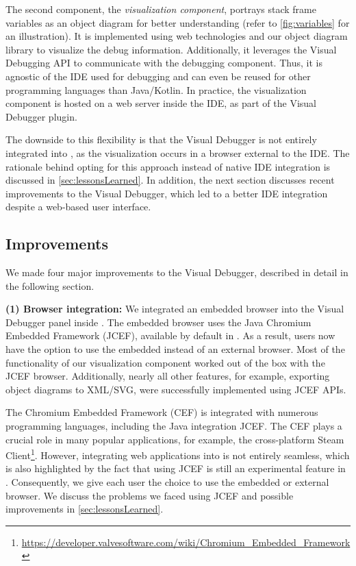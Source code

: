 \documentclass[sigconf]{acmart}
\begin{document}
The second component, the \textit{visualization component}, portrays stack frame variables as an object diagram for better understanding (refer to \autoref{fig:variables} for an illustration).
It is implemented using web technologies and our object diagram library \cite{timkrauterObjectdiagramjs2023} to visualize the debug information.
Additionally, it leverages the Visual Debugging API to communicate with the debugging component.
Thus, it is agnostic of the IDE used for debugging and can even be reused for other programming languages than Java/Kotlin.
In practice, the visualization component is hosted on a web server inside the IDE, as part of the Visual Debugger plugin.

The downside to this flexibility is that the Visual Debugger is not entirely integrated into \intellij{}, as the visualization occurs in a browser external to the IDE.
The rationale behind opting for this approach instead of native IDE integration is discussed in \autoref{sec:lessonsLearned}.
In addition, the next section discusses recent improvements to the Visual Debugger, which led to a better IDE integration despite a web-based user interface.

\subsection{Improvements} \label{subsec:improvements}
We made four major improvements to the Visual Debugger, described in detail in the following section.

\textbf{(1) Browser integration:} We integrated an embedded browser into the Visual Debugger panel inside \intellij{}.
The embedded browser uses the Java Chromium Embedded Framework (JCEF), available by default in \intellij{}.
As a result, users now have the option to use the embedded instead of an external browser.
Most of the functionality of our visualization component worked out of the box with the JCEF browser.
Additionally, nearly all other features, for example, exporting object diagrams to XML/SVG, were successfully implemented using JCEF APIs.

The Chromium Embedded Framework (CEF) \cite{marshallgreenblattChromiumEmbeddedFramework2023} is integrated with numerous programming languages, including the Java integration JCEF.
The CEF plays a crucial role in many popular applications, for example, the cross-platform Steam Client\footnote{\url{https://developer.valvesoftware.com/wiki/Chromium_Embedded_Framework}}.
However, integrating web applications into \intellij{} is not entirely seamless, which is also highlighted by the fact that using JCEF is still an experimental feature in \intellij{}.
Consequently, we give each user the choice to use the embedded or external browser.
We discuss the problems we faced using JCEF and possible improvements in \autoref{sec:lessonsLearned}.
\end{document}
